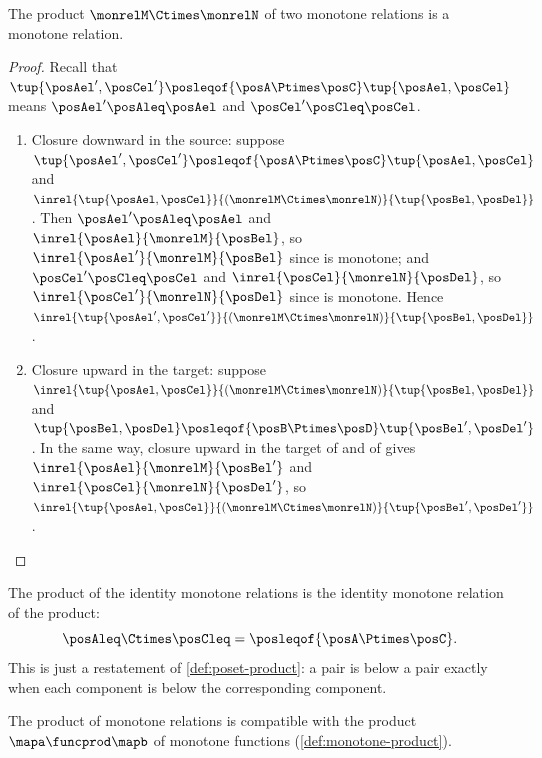 \begin{lemma}
    \label{lem:monrel-product}
    The product $\monrelM \Ctimes \monrelN$ of two monotone relations is a monotone relation.
\end{lemma}
\begin{proof}
    Recall that $\tup{\posAel', \posCel'} \posleqof{\posA \Ptimes \posC} \tup{\posAel, \posCel}$ means $\posAel' \posAleq \posAel$ and $\posCel' \posCleq \posCel$.
    \begin{enumerate}
        \item Closure downward in the source: suppose $\tup{\posAel', \posCel'} \posleqof{\posA \Ptimes \posC} \tup{\posAel, \posCel}$ and $\inrel{\tup{\posAel, \posCel}}{(\monrelM \Ctimes \monrelN)}{\tup{\posBel, \posDel}}$.
              Then $\posAel' \posAleq \posAel$ and $\inrel{\posAel}{\monrelM}{\posBel}$, so $\inrel{\posAel'}{\monrelM}{\posBel}$ since \monrelM is monotone; and $\posCel' \posCleq \posCel$ and $\inrel{\posCel}{\monrelN}{\posDel}$, so $\inrel{\posCel'}{\monrelN}{\posDel}$ since \monrelN is monotone.
              Hence $\inrel{\tup{\posAel', \posCel'}}{(\monrelM \Ctimes \monrelN)}{\tup{\posBel, \posDel}}$.
        \item Closure upward in the target: suppose $\inrel{\tup{\posAel, \posCel}}{(\monrelM \Ctimes \monrelN)}{\tup{\posBel, \posDel}}$ and $\tup{\posBel, \posDel} \posleqof{\posB \Ptimes \posD} \tup{\posBel', \posDel'}$.
              In the same way, closure upward in the target of \monrelM and of \monrelN gives $\inrel{\posAel}{\monrelM}{\posBel'}$ and $\inrel{\posCel}{\monrelN}{\posDel'}$, so $\inrel{\tup{\posAel, \posCel}}{(\monrelM \Ctimes \monrelN)}{\tup{\posBel', \posDel'}}$.
    \end{enumerate}
\end{proof}

\begin{example}
    The product of the identity monotone relations is the identity monotone relation of the product:
    \begin{equation}
        \posAleq \Ctimes \posCleq = \posleqof{\posA \Ptimes \posC}.
    \end{equation}
    This is just a restatement of \cref{def:poset-product}: a pair is below a pair exactly when each component is below the corresponding component.
\end{example}

The product of monotone relations is compatible with the product $\mapa \funcprod \mapb$ of monotone functions (\cref{def:monotone-product}).

